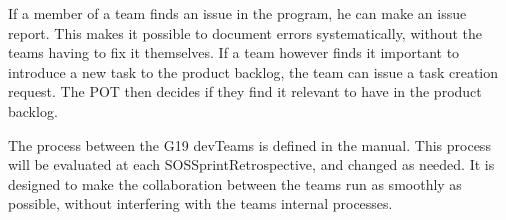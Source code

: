 If a member of a team finds an issue in the program, he can make an issue report. This makes it possible to document errors systematically, without the \glspl{team} having to fix it themselves. If a \gls{team} however finds it important to introduce a new task to the product backlog, the team can issue a task creation request. The \gls{POT} then decides if they find it relevant to have in the product backlog.

The process between the \gls{G19} \glspl{devTeam} is defined in the manual. This process will be evaluated at each \gls{SOSSprintRetrospective}, and changed as needed. It is designed to make the collaboration between the \glspl{team} run as smoothly as possible, without interfering with the \glspl{team} internal processes.
